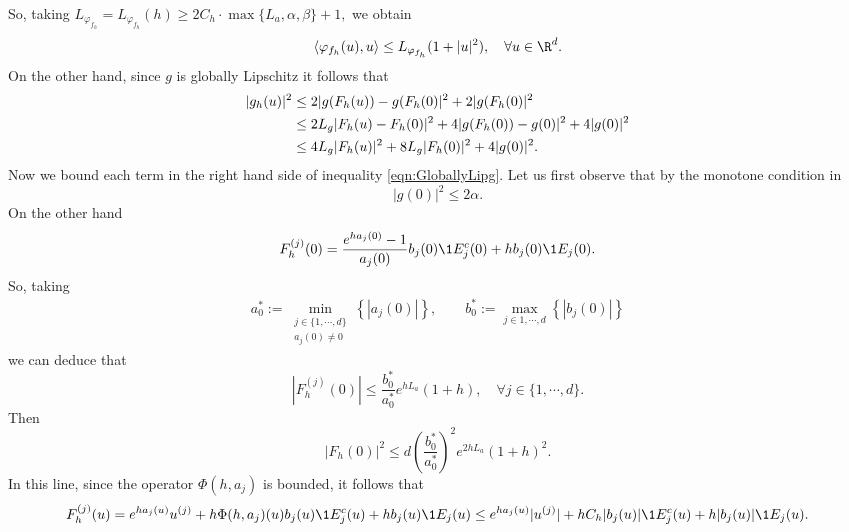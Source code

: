 \documentclass[sort&compress, preprint]{elsarticle}
\theoremstyle{definition}
\theoremstyle{plain}%
\theoremstyle{remark}
\newcommand{\innerprod}[2]{\left\langle#1, #2\right\rangle}
\begin{document}
\begin{pf}
	So, taking 
	$
		L_{\varphi_{f_h}} = L_{\varphi_{f_h}}(h) \geq 2 C_h \cdot \max\{L_a, \alpha, \beta\} + 1,
	$ 
	we obtain
	\begin{equation}\label{eqn:VarphifhDotProdBound}
		\innerprod{ \varphi_{f_h}(u)}{u}
		\leq 
			L_{\varphi_{f_h}} (1+|u|^2), \quad \forall u \in \R^d.
	\end{equation}
	On the other hand, since $g$ is globally Lipschitz it follows that
	\begin{align}\label{eqn:GloballyLipg}
		|g_h(u)|^2 
		&\leq
			2 |g(F_h(u)) - g(F_h(0)|^2  + 2 | g(F_h(0)|^2 \notag \\
		&\leq 
			2 L_g |F_h(u) - F_h(0)|^2  + 4 |g(F_h(0)) - g(0)|^2 + 4 |g(0)|^2 \notag\\ 
		&\leq 
			4 L_g |F_h(u)|^2  + 8 L_g |F_h(0)|^2  + 4 |g(0)|^2 .
	\end{align}
	Now we bound each term in the right hand side of inequality \eqref{eqn:GloballyLipg}.
	Let us first observe that by the monotone condition in 
	\begin{equation} \label{eqn:Boundgzero}
		|g(0)|^2 \leq 2\alpha.
	\end{equation}
	On the other hand 
	\begin{align*}
		F_h^{(j)} (0) =
			\frac{e^{h a_j(0)}-1}{a_j(0)} b_j(0) \1{E_j^c}(0) + hb_j(0) \1{E_j}(0).
	\end{align*}
	So, taking
	\begin{align*}
		a^*_0 := 
			\min_{
				\substack{
					j \in \{1, \cdots, d \}\\
					a_j(0) \neq 0
				}
			}
			\left\{
				|a_j(0)|
			\right\},
			\qquad
		b^*_0 :=
			\max_{
				j\in {1,\cdots, d}
			}
			\left\{
				|b_j(0)|
			\right\}
	\end{align*}
	we can deduce that
	\begin{equation*}
		|F_h^{(j)}(0)| 
			\leq
			\frac{b_0^*}{a_0^*}
			e^{h L_a} (1+h),
			\quad
			\forall j \in \{1, \cdots, d\}.  
	\end{equation*}
	Then
	\begin{equation} \label{eqn:BoundFhZero}
		|F_h(0)|^2 
			\leq
			d\left(
				\frac{b_0^*}{a_0^*}
			\right)^2
		e^{2h L_a} (1+h)^2.
	\end{equation}
	In this line, since the operator $\Phi(h,a_j)$ is bounded, it follows that
	\begin{dmath*}
		F_h^{(j)}(u) 
			=
			e^{h a_j(u)} u^{(j)} +
			h \Phi(h, a_j)(u) b_j(u) \1{E_j^c}(u) +h b_j(u) \1{E_j}(u)
			\leq
			e^{h a_j(u)} |u^{(j)}| +
			h C_h |b_j(u)| \1{E_j^c}(u) +h |b_j(u)| \1{E_j}(u).

\end{dmath*}
\end{pf}
\end{document}

